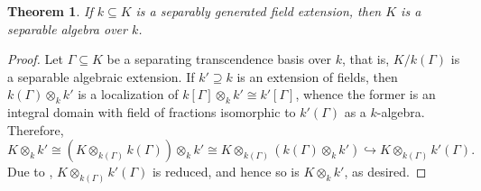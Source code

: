 \documentclass[10pt]{article}
\theoremstyle{thmstyle}
\newtheorem{theorem}{Theorem}[section]
\theoremstyle{defstyle}
\newcommand{\into}{\hookrightarrow}
\begin{document}
\begin{theorem}
    If $k\subseteq K$ is a separably generated field extension, then $K$ is a separable algebra over $k$.
\end{theorem}
\begin{proof}
    Let $\Gamma\subseteq K$ be a separating transcendence basis over $k$, that is, $K/k(\Gamma)$ is a separable algebraic extension. If $k'\supseteq k$ is an extension of fields, then $k(\Gamma)\otimes_k k'$ is a localization of $k[\Gamma]\otimes_k k'\cong k'[\Gamma]$, whence the former is an integral domain with field of fractions isomorphic to $k'(\Gamma)$ as a $k$-algebra. Therefore, 
    \begin{equation*}
        K\otimes_k k'\cong \left(K\otimes_{k(\Gamma)} k(\Gamma)\right)\otimes_k k'\cong K\otimes_{k(\Gamma)}\left(k(\Gamma)\otimes_k k'\right)\into K\otimes_{k(\Gamma)} k'(\Gamma).
    \end{equation*}
    Due to , $K\otimes_{k(\Gamma)} k'(\Gamma)$ is reduced, and hence so is $K\otimes_k k'$, as desired.
\end{proof}
\end{document}
